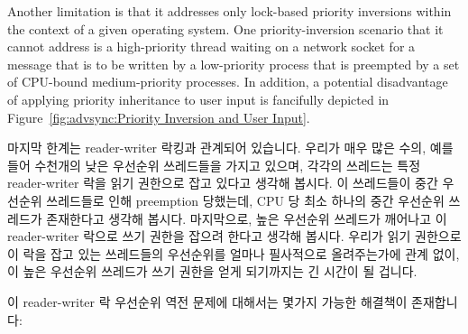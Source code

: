 Another limitation is that it addresses only lock-based priority
inversions within the context of a given operating system.
One priority-inversion scenario that it cannot address is a high-priority
thread waiting on a network socket for a message that is to be written
by a low-priority process that is preempted by a set of CPU-bound
medium-priority processes.
In addition, a potential disadvantage of applying priority inheritance
to user input is fancifully depicted in
Figure~\ref{fig:advsync:Priority Inversion and User Input}.
\fi

마지막 한계는 reader-writer 락킹과 관계되어 있습니다.
우리가 매우 많은 수의, 예를 들어 수천개의 낮은 우선순위 쓰레드들을 가지고
있으며, 각각의 쓰레드는 특정 reader-writer 락을 읽기 권한으로 잡고 있다고
생각해 봅시다.
이 쓰레드들이 중간 우선순위 쓰레드들로 인해 preemption 당했는데, CPU 당 최소
하나의 중간 우선순위 쓰레드가 존재한다고 생각해 봅시다.
마지막으로, 높은 우선순위 쓰레드가 깨어나고 이 reader-writer 락으로 쓰기 권한을
잡으려 한다고 생각해 봅시다.
우리가 읽기 권한으로 이 락을 잡고 있는 쓰레드들의 우선순위를 얼마나 필사적으로
올려주는가에 관계 없이, 이 높은 우선순위 쓰레드가 쓰기 권한을 얻게 되기까지는
긴 시간이 될 겁니다.

이 reader-writer 락 우선순위 역전 문제에 대해서는 몇가지 가능한 해결책이
존재합니다:

